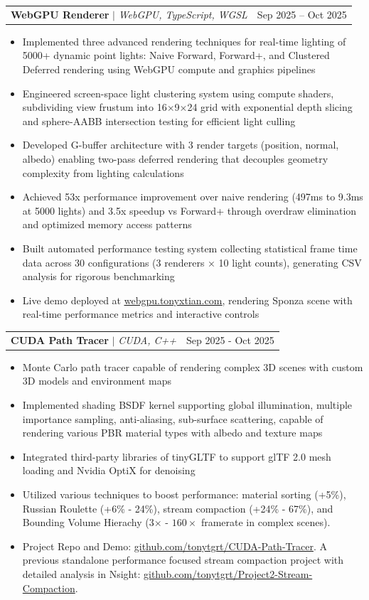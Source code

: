 \documentclass[letterpaper,11pt]{article}
\makeatletter
\newcommand{\resumeItem}[1]{
  \item\small{
    {#1 \vspace{-3pt}}
  }
}
\newcommand{\resumeProjectHeading}[2]{
    \item
    \begin{tabular*}{0.97\textwidth}{l@{\extracolsep{\fill}}r}
      \small#1 & #2 \\
    \end{tabular*}\vspace{-7pt}
}
\newcommand{\resumeItemListStart}{\begin{itemize}}
\newcommand{\resumeItemListEnd}{\end{itemize}\vspace{-5pt}}
\makeatother
\begin{document}
    \resumeProjectHeading
          {\textbf{WebGPU Renderer} $|$ \emph{WebGPU, TypeScript, WGSL}}{Sep 2025 -- Oct 2025}
          \resumeItemListStart
          \resumeItem{Implemented three advanced rendering techniques for real-time lighting of 5000+ dynamic point lights: Naive Forward, Forward+, and Clustered Deferred rendering using WebGPU compute and graphics pipelines}
          \resumeItem{Engineered screen-space light clustering system using compute shaders, subdividing view frustum into 16×9×24 grid with exponential depth slicing and sphere-AABB intersection testing for efficient light culling}
          \resumeItem{Developed G-buffer architecture with 3 render targets (position, normal, albedo) enabling two-pass deferred rendering that decouples geometry complexity from lighting calculations}
          \resumeItem{Achieved 53x performance improvement over naive rendering (497ms to 9.3ms at 5000 lights) and 3.5x speedup vs Forward+ through overdraw elimination and optimized memory access patterns}
          \resumeItem{Built automated performance testing system collecting statistical frame time data across 30 configurations (3 renderers × 10 light counts), generating CSV analysis for rigorous benchmarking}
          \resumeItem{Live demo deployed at \href{http://webgpu.tonyxtian.com}{\underline{webgpu.tonyxtian.com}}, rendering Sponza scene with real-time performance metrics and interactive controls}
          \resumeItemListEnd

    \resumeProjectHeading
        {\textbf{CUDA Path Tracer} $|$ \emph{CUDA, C++}}{Sep 2025 - Oct 2025}
        \resumeItemListStart
        \resumeItem{Monte Carlo path tracer capable of rendering complex 3D scenes with custom 3D models and environment maps}
        \resumeItem{Implemented shading BSDF kernel supporting global illumination, multiple importance sampling, anti-aliasing, sub-surface scattering, capable of rendering various PBR material types with albedo and texture maps}
        \resumeItem{Integrated third-party libraries of tinyGLTF to support glTF 2.0 mesh loading and Nvidia OptiX for denoising}
        \resumeItem{Utilized various techniques to boost performance: material sorting (+5\%), Russian Roulette (+6\% - 24\%), stream compaction (+24\% - 67\%), and Bounding Volume Hierachy (3$\times$ - $160\times$ framerate in complex scenes). }
        \resumeItem{Project Repo and Demo: \href{https://github.com/tonytgrt/CUDA-Path-Tracer}{github.com/tonytgrt/CUDA-Path-Tracer}. A previous standalone performance focused stream compaction project with detailed analysis in Nsight: \href{https://github.com/tonytgrt/Project2-Stream-Compaction}{github.com/tonytgrt/Project2-Stream-Compaction}.}
    \resumeItemListEnd
\end{document}
